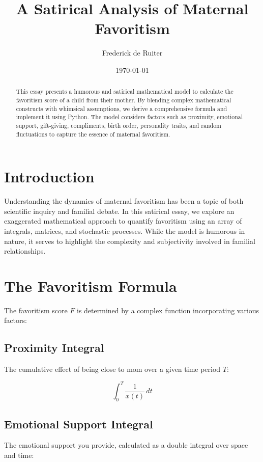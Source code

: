 \documentclass[12pt]{article}
\begin{document}
\title{A Satirical Analysis of Maternal Favoritism}
\author{Frederick de Ruiter}
\date{\today}

\maketitle

\begin{abstract}
This essay presents a humorous and satirical mathematical model to calculate the favoritism score of a child from their mother. By blending complex mathematical constructs with whimsical assumptions, we derive a comprehensive formula and implement it using Python. The model considers factors such as proximity, emotional support, gift-giving, compliments, birth order, personality traits, and random fluctuations to capture the essence of maternal favoritism.
\end{abstract}

\tableofcontents

\section{Introduction}

Understanding the dynamics of maternal favoritism has been a topic of both scientific inquiry and familial debate. In this satirical essay, we explore an exaggerated mathematical approach to quantify favoritism using an array of integrals, matrices, and stochastic processes. While the model is humorous in nature, it serves to highlight the complexity and subjectivity involved in familial relationships.

\section{The Favoritism Formula}

The favoritism score \( F \) is determined by a complex function incorporating various factors:

\subsection{Proximity Integral}
The cumulative effect of being close to mom over a given time period \( T \):

\begin{equation}
\int_0^T \frac{1}{x(t)} \, dt
\end{equation}

\subsection{Emotional Support Integral}
The emotional support you provide, calculated as a double integral over space and time:
\end{document}
